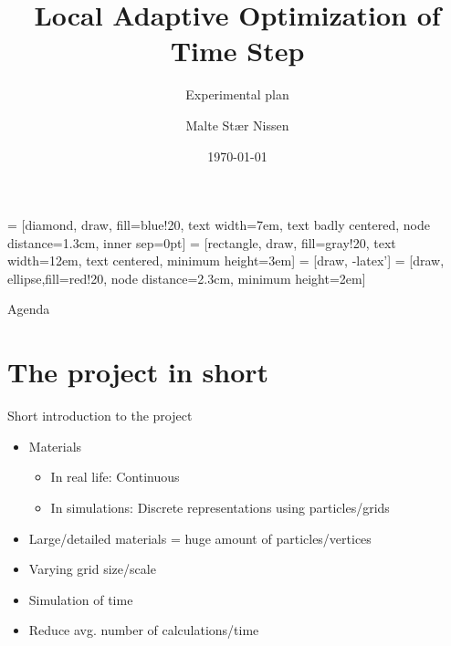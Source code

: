 \usepackage{pslatex}
\usepackage{listing}
\usepackage{caption}
\usepackage{subcaption}
\usepackage{multirow}

\usepackage{etoolbox}%

\usepackage{tikz}
\usetikzlibrary{shapes,arrows}
\newcommand{\itemv}[1]{\item{#1}}


\usepackage{scalefnt}



\title{Local Adaptive Optimization of Time Step}
\subtitle{Experimental plan}
\author{Malte Stær Nissen}
\date{\today}



 = [diamond, draw, fill=blue!20, 
    text width=7em, text badly centered, node distance=1.3cm, inner sep=0pt]
 = [rectangle, draw, fill=gray!20, 
    text width=12em, text centered, minimum height=3em]
 = [draw, -latex']
 = [draw, ellipse,fill=red!20, node distance=2.3cm, minimum height=2em]

\frame[plain]{\titlepage}

\begin{frame}{Agenda}
	\begin{center}
	\end{center}
\end{frame}

\section{The project in short}
\begin{frame}{Short introduction to the project}
    \pause\begin{itemize}[<+->]
		\itemv Materials
        \begin{itemize}
            \itemv In real life: Continuous
            \itemv In simulations: Discrete representations using
                particles/grids
        \end{itemize}
		\itemv Large/detailed materials = huge amount of particles/vertices
        \itemv Varying grid size/scale
        \itemv Simulation of time
        \itemv Reduce avg. number of calculations/time
	\end{itemize}
\end{frame}

